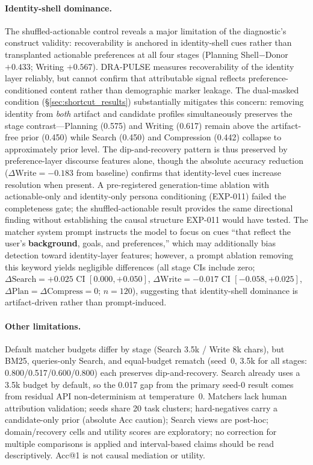 \documentclass[]{article}
\begin{document}
\paragraph{Identity-shell dominance.}
The shuffled-actionable control reveals a major limitation of the
diagnostic's construct validity: recoverability is anchored in identity-shell
cues rather than transplanted actionable preferences at all four stages
(Planning Shell$-$Donor $+0.433$; Writing $+0.567$).
DRA-PULSE measures recoverability of the identity layer reliably, but cannot
confirm that attributable signal reflects preference-conditioned content rather
than demographic marker leakage.
The dual-masked condition (\S\ref{sec:shortcut_results}) substantially mitigates
this concern: removing identity from \emph{both} artifact and candidate profiles
simultaneously preserves the stage contrast---Planning (0.575) and Writing (0.617)
remain above the artifact-free prior (0.450) while Search (0.450) and Compression
(0.442) collapse to approximately prior level.
The dip-and-recovery pattern is thus preserved by preference-layer discourse
features alone, though the absolute accuracy reduction ($\Delta\text{Write}=-0.183$
from baseline) confirms that identity-level cues increase resolution when present.
A pre-registered generation-time ablation with actionable-only and
identity-only persona conditioning (EXP-011) failed the completeness gate;
the shuffled-actionable result provides the same directional finding
without establishing the causal structure EXP-011 would have tested.
The matcher system prompt instructs the model to focus on cues ``that reflect
the user's \textbf{background}, goals, and preferences,'' which may additionally bias
detection toward identity-layer features; however, a prompt ablation removing
this keyword yields negligible differences (all stage CIs include zero;
$\Delta\text{Search}=+0.025$ CI $[0.000,+0.050]$,
$\Delta\text{Write}=-0.017$ CI $[-0.058,+0.025]$,
$\Delta\text{Plan}=\Delta\text{Compress}=0$; $n=120$), suggesting that
identity-shell dominance is artifact-driven rather than prompt-induced.

\paragraph{Other limitations.}
Default matcher budgets differ by stage (Search 3.5k / Write 8k chars), but
BM25, queries-only Search, and equal-budget rematch (seed~0, 3.5k for all
stages: 0.800/0.517/0.600/0.800) each preserves dip-and-recovery.
Search already uses a 3.5k budget by default, so the 0.017 gap from the
primary seed-0 result comes from residual API non-determinism at temperature~0. Matchers
lack human attribution validation; seeds share 20 task clusters; hard-negatives
carry a candidate-only prior (absolute Acc caution); Search views are post-hoc;
domain/recovery cells and utility scores are exploratory; no correction for
multiple comparisons is applied and interval-based claims should be read
descriptively. Acc@1 is not causal mediation or utility.
\end{document}
